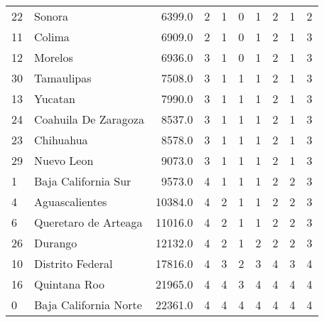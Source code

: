 \begin{tabular}{llrrrrrrrr}
22 &                 Sonora &     6399.0 &     2 &      1 &     0 &      1 &      2 &      1 &      2 \\
11 &                 Colima &     6909.0 &     2 &      1 &     0 &      1 &      2 &      1 &      3 \\
12 &                Morelos &     6936.0 &     3 &      1 &     0 &      1 &      2 &      1 &      3 \\
30 &             Tamaulipas &     7508.0 &     3 &      1 &     1 &      1 &      2 &      1 &      3 \\
13 &                Yucatan &     7990.0 &     3 &      1 &     1 &      1 &      2 &      1 &      3 \\
24 &   Coahuila De Zaragoza &     8537.0 &     3 &      1 &     1 &      1 &      2 &      1 &      3 \\
23 &              Chihuahua &     8578.0 &     3 &      1 &     1 &      1 &      2 &      1 &      3 \\
29 &             Nuevo Leon &     9073.0 &     3 &      1 &     1 &      1 &      2 &      1 &      3 \\
1  &    Baja California Sur &     9573.0 &     4 &      1 &     1 &      1 &      2 &      2 &      3 \\
4  &         Aguascalientes &    10384.0 &     4 &      2 &     1 &      1 &      2 &      2 &      3 \\
6  &   Queretaro de Arteaga &    11016.0 &     4 &      2 &     1 &      1 &      2 &      2 &      3 \\
26 &                Durango &    12132.0 &     4 &      2 &     1 &      2 &      2 &      2 &      3 \\
10 &       Distrito Federal &    17816.0 &     4 &      3 &     2 &      3 &      4 &      3 &      4 \\
16 &           Quintana Roo &    21965.0 &     4 &      4 &     3 &      4 &      4 &      4 &      4 \\
0  &  Baja California Norte &    22361.0 &     4 &      4 &     4 &      4 &      4 &      4 &      4 \\
\bottomrule
\end{tabular}
